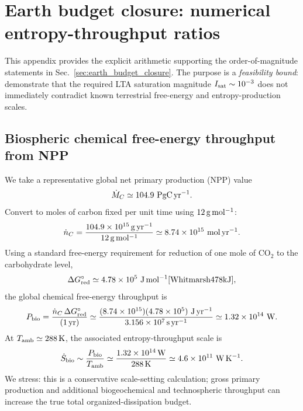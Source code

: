 \documentclass[10pt]{article}
\begin{document}

\section{Earth budget closure: numerical entropy-throughput ratios}
\label{app:earth_budget_numbers}

This appendix provides the explicit arithmetic supporting the order-of-magnitude statements in
Sec.~\ref{sec:earth_budget_closure}. The purpose is a \emph{feasibility bound}: demonstrate that the
required LTA saturation magnitude \(I_{\rm sat}\sim 10^{-3}\) does not immediately contradict known
terrestrial free-energy and entropy-production scales.

\subsection{Biospheric chemical free-energy throughput from NPP}

We take a representative global net primary production (NPP) value
\cite{Field1998NPP,BioNumbersNPP}
\begin{equation}
\dot M_C \simeq 104.9\ {\rm PgC\,yr^{-1}}.
\end{equation}
Convert to moles of carbon fixed per unit time using \(12\,{\rm g\,mol^{-1}}\):
\begin{equation}
\dot n_C
= \frac{104.9\times 10^{15}\,{\rm g\,yr^{-1}}}{12\,{\rm g\,mol^{-1}}}
\simeq 8.74\times 10^{15}\ {\rm mol\,yr^{-1}}.
\end{equation}
Using a standard free-energy requirement for reduction of one mole of CO\(_2\) to the carbohydrate
level,
\begin{equation}
\Delta G^\circ_{\rm red} \simeq 4.78\times 10^5\ {\rm J\,mol^{-1}} \cite{Whitmarsh478kJ},
\end{equation}
the global chemical free-energy throughput is
\begin{equation}
P_{\rm bio}
= \frac{\dot n_C\,\Delta G^\circ_{\rm red}}{(1\,{\rm yr})}
\simeq
\frac{(8.74\times 10^{15})(4.78\times 10^5)\ {\rm J\,yr^{-1}}}{3.156\times 10^7\,{\rm s\,yr^{-1}}}
\simeq 1.32\times 10^{14}\ {\rm W}.
\label{eq:Pbio_value}
\end{equation}
At \(T_{\rm amb}\simeq 288\,{\rm K}\), the associated entropy-throughput scale is
\begin{equation}
\dot S_{\rm bio} \sim \frac{P_{\rm bio}}{T_{\rm amb}}
\simeq \frac{1.32\times 10^{14}\,{\rm W}}{288\,{\rm K}}
\simeq 4.6\times 10^{11}\ {\rm W\,K^{-1}}.
\label{eq:Sbio_value}
\end{equation}
We stress: this is a conservative scale-setting calculation; gross primary production and additional
biogeochemical and technospheric throughput can increase the true total organized-dissipation budget.
\end{document}
